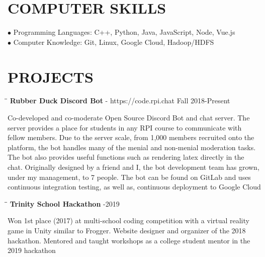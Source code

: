 \documentclass{res}
\begin{document}
\begin{resume}
\vspace{-0.1in}
\section{COMPUTER SKILLS}
    $\bullet$  Programming Languages: C++, Python, Java, JavaScript, Node, Vue.js\\
     $\bullet$ Computer Knowledge: Git, Linux, Google Cloud, Hadoop/HDFS

\vspace{-0.1in}
\section{PROJECTS}
	\vspace{-0.1in}
	\begin{tabbing}
   \hspace{2.3in}\= \hspace{3.6in}\= \kill
    {\bf Rubber Duck Discord Bot} - https://code.rpi.chat \>   \>Fall 2018-Present
   \end{tabbing}\vspace{-20pt}
   Co-developed and co-moderate Open Source Discord Bot and chat server. The server provides a place for students in any RPI course to communicate with fellow members. Due to the server scale, from 1,000 members recruited onto the platform, the bot handles many of the menial and non-menial moderation tasks. The bot also provides useful functions such as rendering latex directly in the chat. Originally designed by a friend and I, the bot development team has grown, under my management, to 7 people. The bot can be found on GitLab and uses continuous integration testing, as well as, continuous deployment to Google Cloud
	\vspace{-15pt}
	\begin{tabbing}
   \hspace{2.3in}\= \hspace{4in}\= \kill
    {\bf Trinity School Hackathon} \>  -2019
   \end{tabbing}\vspace{-20pt}
	Won 1st place (2017) at multi-school coding competition with a virtual reality game in Unity similar to Frogger. Website designer and organizer of the 2018 hackathon. Mentored and taught workshops as a college student mentor in the 2019 hackathon



\end{resume}
\end{document}
